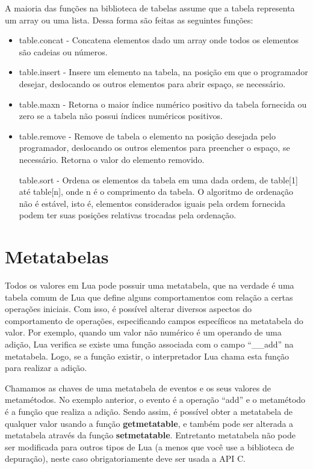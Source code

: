 \documentclass[
12pt, %
openright, %
oneside, %
a4paper, %
english, %
brazil, %
]{abntex2}
\begin{document}
A maioria das funções na biblioteca de tabelas assume que a tabela representa um array ou uma lista. Dessa forma são feitas as seguintes funções:

\begin{itemize}

\item table.concat - Concatena elementos dado um array onde todos os elementos são cadeias ou números.

\item table.insert - Insere um elemento na tabela, na posição em que o programador desejar, deslocando os outros elementos para abrir espaço, se necessário.

\item table.maxn - Retorna o maior índice numérico positivo da tabela fornecida ou zero se a tabela não possui índices numéricos positivos.

\item table.remove - Remove de tabela o elemento na posição desejada pelo programador, deslocando os outros elementos para preencher o espaço, se necessário. Retorna o valor do elemento removido.

table.sort - Ordena os elementos da tabela em uma dada ordem, de table[1] até table[n], onde n é o comprimento da tabela. 
O algoritmo de ordenação não é estável, isto é, elementos considerados iguais pela ordem fornecida podem ter suas posições relativas trocadas pela ordenação.
\end{itemize}

\section{Metatabelas}
Todos os valores em Lua pode possuir uma metatabela, que na verdade é uma tabela comum de Lua que define alguns comportamentos com relação a certas operações iniciais. Com isso, é possível alterar diversos aspectos do comportamento de operações, especificando campos específicos na metatabela do valor. Por exemplo, quando um valor não numérico é um operando de uma adição, Lua verifica se existe uma função associada com o campo ``\_\_add'' na metatabela. Logo, se a função existir, o interpretador Lua chama esta função para realizar a adição.

Chamamos as chaves de uma metatabela de eventos e os seus valores de metamétodos. No exemplo anterior, o evento é a operação ``add'' e o metamétodo é a função que realiza a adição. Sendo assim, é possível obter a metatabela de qualquer valor usando a função \textbf{getmetatable}, e também pode ser alterada a metatabela através da função \textbf{setmetatable}. Entretanto metatabela não pode ser modificada para outros tipos de Lua (a menos que você use a biblioteca de depuração), neste caso obrigatoriamente deve ser usada a API C.
\end{document}

